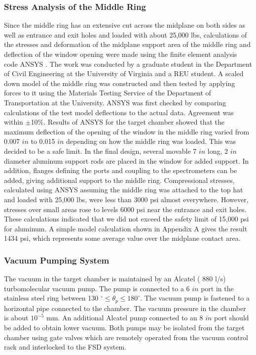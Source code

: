 \subsubsection{Stress Analysis of the Middle Ring}

Since the middle ring has an extensive cut across the midplane on both sides as
well as
entrance and exit holes and loaded with about 25,000 lbs, calculations of the
stresses
 and deformation of  the
midplane support area of the middle ring and deflection of the window opening
were made using the finite element analysis code ANSYS . The work was conducted
by a graduate student in the Department of Civil Engineering at the
University of
Virginia and a REU student.  A scaled down model of the middle ring was
constructed and then tested by applying forces to it using the Materials Testing
Service of the Department of Transportation at the University. ANSYS was first
checked by comparing calculations of the test model deflections to the actual
data. Agreement was  within $\pm$10\%. Results of ANSYS for the target
chamber showed that the maximum deflection of the opening of the window in the
middle ring varied from 0.007 $in$ to 0.015 $in$ depending on how the
middle ring
was loaded. This was decided to be a safe limit. In the final design, several
movable
7 $in$ long, 2 $in$ diameter aluminum support rods are placed in the
window for added support. In addition, flanges defining the ports and
coupling to
the spectrometers can be added, giving additional support to the middle ring.
Compressional stresses, calculated using ANSYS assuming the middle ring was
attached to the
top hat and loaded with 25,000 lbs, were less than 3000 psi 
almost everywhere.
However, stresses over small areas rose to levels 6000 psi near the entrance
and exit holes. These calculations indicated that we did not exceed the safety
limit of 15,000 psi for aluminum. A simple model calculation shown in Appendix
A  gives the result 1434 psi, which represents some average value over the
midplane
contact area.

\subsubsection{Vacuum Pumping System}

The vacuum in the target chamber is maintained by an Alcatel ( 880 l/s)
 turbomolecular vacuum pump. The pump is connected to a 6 $in$ port in the
stainless steel ring between 130
 $^\circ \le \theta_p \le 180 ^\circ$. The vacuum pump is
fastened to a horizontal pipe connected to the chamber. The vacuum pressure in
the chamber is about $10^{-5}$ mm. An additional Alcatel pump connected
to an 8 $in$ port should be added to obtain lower vacuum. Both
pumps may be isolated
from the target chamber using gate valves which are remotely operated
from the vacuum control rack and interlocked to the FSD system.


